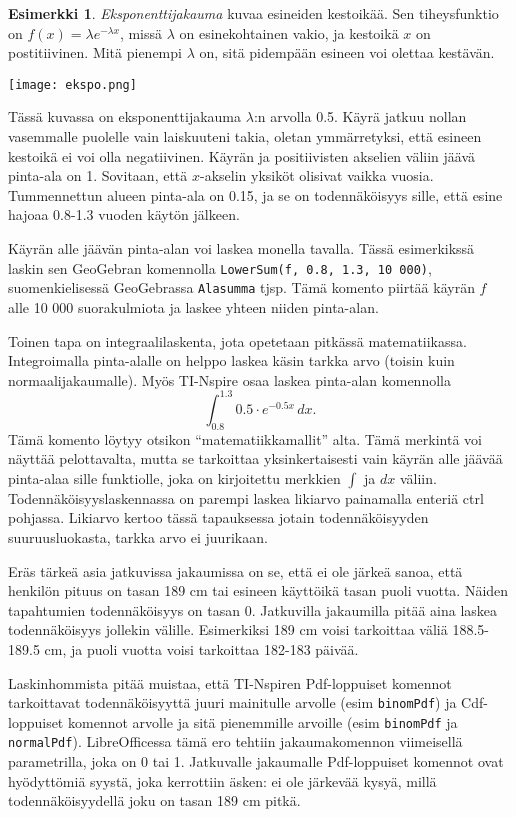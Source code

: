 \documentclass[12pt,leqno,a4paper,oneside]{amsart}
\theoremstyle{definition}
\newtheorem{example}[proclaim]{Esimerkki}
\theoremstyle{remark}
\numberwithin{equation}{section}
\begin{document}
\begin{example}
 \emph{Eksponenttijakauma} kuvaa esineiden kestoikää. Sen tiheysfunktio on $f(x) = \lambda e^{-\lambda x}$, missä $\lambda$ on esinekohtainen vakio,
 ja kestoikä $x$ on postitiivinen. Mitä pienempi $\lambda$ on, sitä pidempään esineen voi olettaa kestävän.
 
 \texttt{[image: ekspo.png]}
 
 Tässä kuvassa on eksponenttijakauma $\lambda$:n arvolla 0.5. Käyrä jatkuu nollan vasemmalle puolelle vain laiskuuteni takia, oletan ymmärretyksi, 
 että esineen kestoikä ei voi olla negatiivinen. Käyrän ja positiivisten akselien väliin jäävä pinta-ala on 1. Sovitaan, että $x$-akselin yksiköt olisivat
 vaikka vuosia. Tummennettun alueen pinta-ala on 0.15, ja se on todennäköisyys sille, että esine hajoaa 0.8-1.3 vuoden käytön jälkeen.
 
 Käyrän alle jäävän pinta-alan voi laskea monella tavalla. Tässä esimerkikssä laskin sen GeoGebran komennolla \texttt{LowerSum(f, 0.8, 1.3, 10 000)},
 suomenkielisessä GeoGebrassa \texttt{Alasumma} tjsp. Tämä komento piirtää käyrän $f$ alle 10 000 suorakulmiota ja laskee yhteen niiden pinta-alan.
 
 Toinen tapa on integraalilaskenta, jota opetetaan pitkässä ma\-te\-ma\-tii\-kas\-sa. Integroimalla pinta-alalle on helppo laskea käsin tarkka arvo 
 (toisin kuin normaalijakaumalle). Myös TI-Nspire osaa laskea pinta-alan komennolla
 $$\int_{0.8}^{1.3} 0.5\cdot e^{-0.5x} \, dx.$$
 Tämä komento löytyy otsikon ``matematiikkamallit'' alta. Tämä merkintä voi näyttää pelottavalta, mutta se tarkoittaa
 yksinkertaisesti vain käyrän alle jäävää pinta-alaa sille funktiolle, joka on kirjoitettu merkkien $\int$ ja $dx$ väliin. Toden\-näköisyys\-laskennassa
 on parempi laskea likiarvo painamalla enteriä ctrl pohjassa. Likiarvo kertoo tässä tapauksessa jotain todennäköisyyden suuruusluokasta, 
 tark\-ka arvo ei juurikaan.
\end{example}

Eräs tärkeä asia jatkuvissa jakaumissa on se, että ei ole järkeä sanoa, että henkilön pituus on tasan 189 cm tai esineen käyttöikä tasan
puoli vuotta. Näiden tapahtumien todennäköisyys on tasan 0. Jatkuvilla jakaumilla pitää aina laskea todennäköisyys jollekin välille. Esimerkiksi
189 cm voisi tarkoittaa väliä 188.5-189.5 cm, ja puoli vuotta voisi tarkoittaa 182-183 päivää.

Laskinhommista pitää muistaa, että TI-Nspiren Pdf-loppuiset komennot tarkoittavat todennäköisyyttä juuri mainitulle arvolle (esim \texttt{binomPdf})
ja Cdf-loppuiset komennot arvolle ja sitä pienemmille arvoille (esim \texttt{binomPdf} ja \texttt{normalPdf}). LibreOfficessa tämä ero tehtiin
jakaumakomennon viimeisellä parametrilla, joka on 0 tai 1. Jatkuvalle jakaumalle Pdf-loppuiset komennot ovat hyödyttömiä syystä, joka kerrottiin äsken:
ei ole järkevää kysyä, millä todennäköisyydellä joku on tasan 189 cm pitkä.
\end{document}
